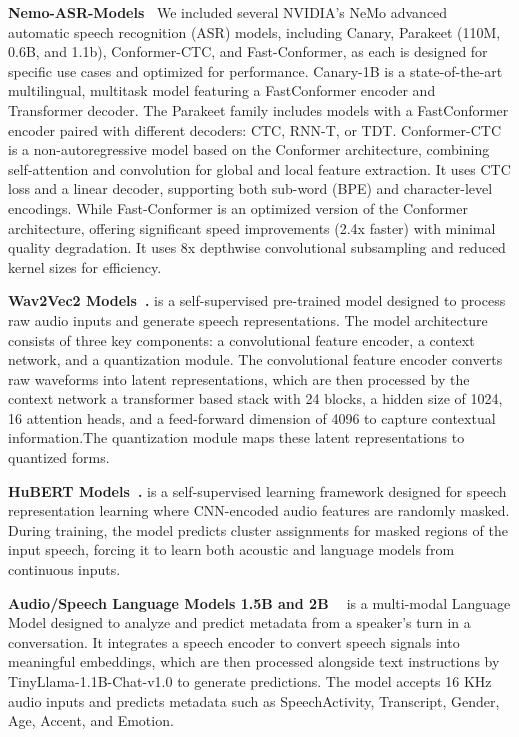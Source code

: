 \noindent\textbf{Nemo-ASR-Models~\cite{gulati2020conformerconvolutionaugmentedtransformerspeech, variani2020hybridautoregressivetransducerhat, rekesh2023fastconformerlinearlyscalable, noroozi2024statefulconformercachebasedinference, tang2023hybridtransducerattentionbased,  Harper_NeMo_a_toolkit}} We included several NVIDIA’s NeMo advanced automatic speech recognition (ASR) models, including Canary, Parakeet (110M, 0.6B, and 1.1b), Conformer-CTC, and Fast-Conformer, as each is designed for specific use cases and optimized for performance. Canary-1B is a state-of-the-art multilingual, multitask model featuring a FastConformer encoder and Transformer decoder. The Parakeet family includes models with a FastConformer encoder paired with different decoders: CTC, RNN-T, or TDT. Conformer-CTC is a non-autoregressive model based on the Conformer architecture, combining self-attention and convolution for global and local feature extraction. It uses CTC loss and a linear decoder, supporting both sub-word (BPE) and character-level encodings. While Fast-Conformer is an optimized version of the Conformer architecture, offering significant speed improvements (2.4x faster) with minimal quality degradation. It uses 8x depthwise convolutional subsampling and reduced kernel sizes for efficiency. 

\noindent\textbf{Wav2Vec2 Models~\cite{schneider2019wav2vecunsupervisedpretrainingspeech, baevski2020wav2vec20frameworkselfsupervised}.} is a self-supervised pre-trained model designed to process raw audio inputs and generate speech representations. The model architecture consists of three key components: a convolutional feature encoder, a context network, and a quantization module.  The convolutional feature encoder converts raw waveforms into latent representations, which are then processed by the context network a transformer based stack with 24 blocks, a hidden size of 1024, 16 attention heads, and a feed-forward dimension of 4096 to capture contextual information.The quantization module maps these latent representations to quantized forms. 

\noindent\textbf{HuBERT Models~\cite{hsu2021hubertselfsupervisedspeechrepresentation}.}
 is a self-supervised learning framework designed for speech representation learning where CNN-encoded audio features are randomly masked. During training, the model predicts cluster assignments for masked regions of the input speech, forcing it to learn both acoustic and language models from continuous inputs.
 
\noindent\textbf{Audio/Speech Language Models 1.5B and 2B ~\cite{Rajaa_SpeechLLM_Multi-Modal_LLM}} is a multi-modal Language Model designed to analyze and predict metadata from a speaker's turn in a conversation. It integrates a speech encoder to convert speech signals into meaningful embeddings, which are then processed alongside text instructions by TinyLlama-1.1B-Chat-v1.0 to generate predictions. The model accepts 16 KHz audio inputs and predicts metadata such as SpeechActivity, Transcript, Gender, Age, Accent, and Emotion. 

